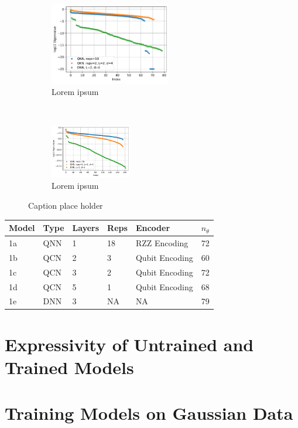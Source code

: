 \begin{figure}[t!]
    \centering
    \begin{subfigure}[t]{0.5\textwidth}
        \centering
        \includegraphics[height=1.4in]{latex/figures/FIM_qubits_4.pdf}
        \caption{Lorem ipsum}
    \end{subfigure}%
    ~ 
    \begin{subfigure}[t]{0.5\textwidth}
        \centering
        \includegraphics[width=1.4in]{latex/figures/FIM_qubits_6.pdf}
        \caption{Lorem ipsum}
    \end{subfigure}
    \caption{Caption place holder}
\end{figure}

\begin{table}[]
\begin{tabular}{|l|l|l|l|l|l|}
\hline
Model &Type & Layers & Reps & Encoder        & $n_{\theta}$ \\ \hline
1a    & QNN & 1     & 18   & RZZ Encoding   & 72  \\ \hline
1b    & QCN & 2      & 3    & Qubit Encoding & 60 \\ \hline
1c    & QCN & 3      & 2    & Qubit Encoding & 72  \\ \hline
1d    & QCN & 5      & 1    & Qubit Encoding & 68  \\ \hline
1e    & DNN & 3      & NA   & NA             & 79 \\ \hline
\end{tabular}
\end{table}

\section{Expressivity of Untrained and Trained Models}\label{sec:Expressivity of Untrained and Trained Models}


\section{Training Models on Gaussian Data}\label{sec:Training Models on Gaussian Data}

